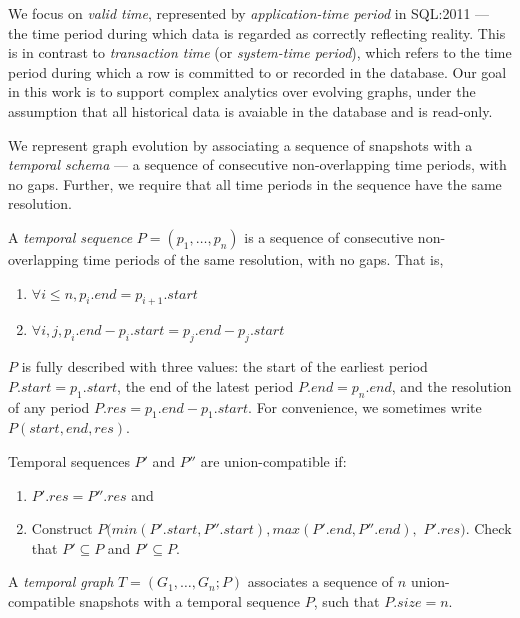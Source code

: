 We focus on {\em valid time}, represented by {\em application-time
  period} in SQL:2011 --- the time period during which data is
regarded as correctly reflecting reality.  This is in contrast to {\em
  transaction time} (or {\em system-time period}), which refers to the
time period during which a row is committed to or recorded in the
database.  Our goal in this work is to support complex analytics over
evolving graphs, under the assumption that all historical data is
avaiable in the database and is read-only.

We represent graph evolution by associating a sequence of snapshots
with a {\em temporal schema} --- a sequence of consecutive
non-overlapping time periods, with no gaps.  Further, we require that
all time periods in the sequence have the same resolution.

\begin{definition}
\label{def:tseq}
A {\em temporal sequence} $P = (p_1, \ldots, p_n)$ is a
sequence of consecutive non-overlapping time periods of the same
resolution, with no gaps.  That is,

\begin{enumerate}
\item $\forall i \leq n, p_i.end = p_{i+1}.start$
\item $\forall i, j, p_i.end - p_i.start = p_j.end - p_j.start$  
\end{enumerate}

$P$ is fully described with three values: the start of the earliest
period $P.start = p_1.start$, the end of the latest period $P.end =
p_n.end$, and the resolution of any period $P.res = p_1.end -
p_1.start$. For convenience, we sometimes write $P(start, end, res)$.
\end{definition}

\begin{definition}
\label{def:tunion}
Temporal sequences $P'$ and $P''$ are union-compatible if:

\begin{enumerate}
\item $P'.res = P''.res$ and
\item Construct $P(min(P'.start, P''.start), max(P'.end, P''.end),$
  $P'.res)$.  Check that $P' \subseteq P$ and $P' \subseteq P$.
\end{enumerate}
\end{definition}

\begin{definition}
\label{def:tgraph}
A {\em temporal graph} $T = (G_1, \ldots, G_n; P)$ associates a
sequence of $n$ union-compatible snapshots with a temporal sequence
$P$, such that $P.size = n$.
\end{definition}

